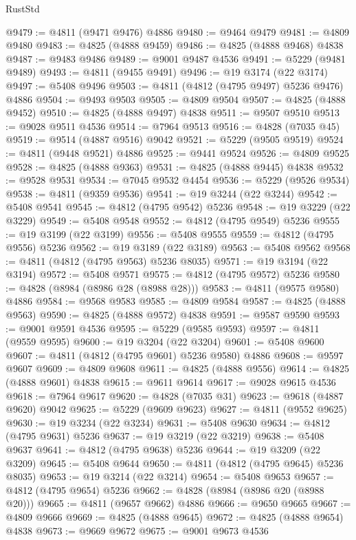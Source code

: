 \begin{lexlean}{RustStd}
\begin{coremodule}
@9479 := @4811 (@9471 @9476) @4886
@9480 := @9464 @9479
@9481 := @4809 @9480
@9483 := @4825 (@4888 @9459)
@9486 := @4825 (@4888 @9468) @4838
@9487 := @9483 @9486
@9489 := @9001 @9487 @4536
@9491 := @5229 (@9481 @9489)
@9493 := @4811 (@9455 @9491)
@9496 := @19 @3174 (@22 @3174)
@9497 := @5408 @9496
@9503 := @4811 (@4812 (@4795 @9497) @5236 @9476) @4886
@9504 := @9493 @9503
@9505 := @4809 @9504
@9507 := @4825 (@4888 @9452)
@9510 := @4825 (@4888 @9497) @4838
@9511 := @9507 @9510
@9513 := @9028 @9511 @4536
@9514 := @7964 @9513
@9516 := @4828 (@7035 @45)
@9519 := @9514 (@4887 @9516) @9042
@9521 := @5229 (@9505 @9519)
@9524 := @4811 (@9448 @9521) @4886
@9525 := @9441 @9524
@9526 := @4809 @9525
@9528 := @4825 (@4888 @9363)
@9531 := @4825 (@4888 @9445) @4838
@9532 := @9528 @9531
@9534 := @7045 @9532 @4454
@9536 := @5229 (@9526 @9534)
@9538 := @4811 (@9359 @9536)
@9541 := @19 @3244 (@22 @3244)
@9542 := @5408 @9541
@9545 := @4812 (@4795 @9542) @5236
@9548 := @19 @3229 (@22 @3229)
@9549 := @5408 @9548
@9552 := @4812 (@4795 @9549) @5236
@9555 := @19 @3199 (@22 @3199)
@9556 := @5408 @9555
@9559 := @4812 (@4795 @9556) @5236
@9562 := @19 @3189 (@22 @3189)
@9563 := @5408 @9562
@9568 := @4811 (@4812 (@4795 @9563) @5236 @8035)
@9571 := @19 @3194 (@22 @3194)
@9572 := @5408 @9571
@9575 := @4812 (@4795 @9572) @5236
@9580 := @4828 (@8984 (@8986 @28 (@8988 @28)))
@9583 := @4811 (@9575 @9580) @4886
@9584 := @9568 @9583
@9585 := @4809 @9584
@9587 := @4825 (@4888 @9563)
@9590 := @4825 (@4888 @9572) @4838
@9591 := @9587 @9590
@9593 := @9001 @9591 @4536
@9595 := @5229 (@9585 @9593)
@9597 := @4811 (@9559 @9595)
@9600 := @19 @3204 (@22 @3204)
@9601 := @5408 @9600
@9607 := @4811 (@4812 (@4795 @9601) @5236 @9580) @4886
@9608 := @9597 @9607
@9609 := @4809 @9608
@9611 := @4825 (@4888 @9556)
@9614 := @4825 (@4888 @9601) @4838
@9615 := @9611 @9614
@9617 := @9028 @9615 @4536
@9618 := @7964 @9617
@9620 := @4828 (@7035 @31)
@9623 := @9618 (@4887 @9620) @9042
@9625 := @5229 (@9609 @9623)
@9627 := @4811 (@9552 @9625)
@9630 := @19 @3234 (@22 @3234)
@9631 := @5408 @9630
@9634 := @4812 (@4795 @9631) @5236
@9637 := @19 @3219 (@22 @3219)
@9638 := @5408 @9637
@9641 := @4812 (@4795 @9638) @5236
@9644 := @19 @3209 (@22 @3209)
@9645 := @5408 @9644
@9650 := @4811 (@4812 (@4795 @9645) @5236 @8035)
@9653 := @19 @3214 (@22 @3214)
@9654 := @5408 @9653
@9657 := @4812 (@4795 @9654) @5236
@9662 := @4828 (@8984 (@8986 @20 (@8988 @20)))
@9665 := @4811 (@9657 @9662) @4886
@9666 := @9650 @9665
@9667 := @4809 @9666
@9669 := @4825 (@4888 @9645)
@9672 := @4825 (@4888 @9654) @4838
@9673 := @9669 @9672
@9675 := @9001 @9673 @4536

\end{coremodule}
\end{lexlean}

